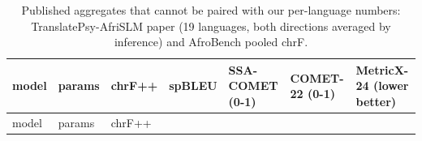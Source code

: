 {\footnotesize\setlength{\tabcolsep}{3pt}
\begin{longtable}[]{@{}
  >{\raggedright\arraybackslash}p{}
  >{\raggedleft\arraybackslash}p{}
  >{\raggedleft\arraybackslash}p{}
  >{\raggedleft\arraybackslash}p{}
  >{\raggedleft\arraybackslash}p{}
  >{\raggedleft\arraybackslash}p{}
  >{\raggedleft\arraybackslash}p{}@{}}
\caption{Published aggregates that cannot be paired with our per-language numbers: TranslatePsy-AfriSLM paper (19 languages, both directions averaged by inference) and AfroBench pooled chrF.}\label{tab:t_model_comparison_published_aggregates}\tabularnewline
\toprule\noalign{}
\begin{minipage}[b]{\linewidth}\raggedright
model
\end{minipage} & \begin{minipage}[b]{\linewidth}\raggedleft
params
\end{minipage} & \begin{minipage}[b]{\linewidth}\raggedleft
chrF++
\end{minipage} & \begin{minipage}[b]{\linewidth}\raggedleft
spBLEU
\end{minipage} & \begin{minipage}[b]{\linewidth}\raggedleft
SSA-COMET (0-1)
\end{minipage} & \begin{minipage}[b]{\linewidth}\raggedleft
COMET-22 (0-1)
\end{minipage} & \begin{minipage}[b]{\linewidth}\raggedleft
MetricX-24 (lower better)
\end{minipage} \\
\midrule\noalign{}
\endfirsthead
\toprule\noalign{}
\begin{minipage}[b]{\linewidth}\raggedright
model
\end{minipage} & \begin{minipage}[b]{\linewidth}\raggedleft
params
\end{minipage} & \begin{minipage}[b]{\linewidth}\raggedleft
chrF++
\end{minipage} & \begin{minipage}[b]{\linewidth}\raggedleft

\end{minipage}
\end{longtable}}
